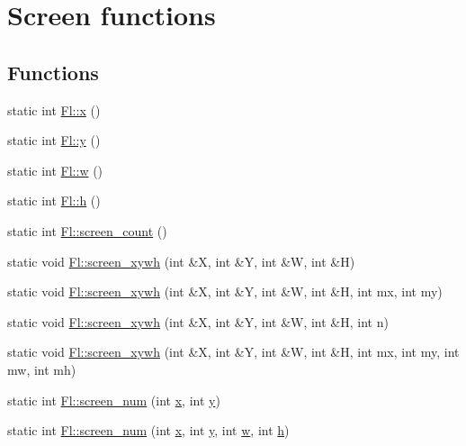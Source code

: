 \hypertarget{group__fl__screen}{}\section{Screen functions}
\label{group__fl__screen}
\subsection*{Functions}
\begin{DoxyCompactItemize}
\item 
static int \hyperlink{group__fl__screen_ga129f4b9d14ad1d720d60b7881693d6ec}{Fl\+::x} ()
\item 
static int \hyperlink{group__fl__screen_ga6c89bea45612ee83941e879b3396d3a5}{Fl\+::y} ()
\item 
static int \hyperlink{group__fl__screen_ga4fcd39428db4299026322c91715cf379}{Fl\+::w} ()
\item 
static int \hyperlink{group__fl__screen_ga0a9410a98136445bacce42b2e3ad4e84}{Fl\+::h} ()
\item 
static int \hyperlink{group__fl__screen_ga8eff7d1c39455cd135ff4560250b3d05}{Fl\+::screen\+\_\+count} ()
\item 
static void \hyperlink{group__fl__screen_ga510d26cb2d6ec0688cf1eb8c5d9e5a1e}{Fl\+::screen\+\_\+xywh} (int \&X, int \&Y, int \&W, int \&H)
\item 
static void \hyperlink{group__fl__screen_gae6ee037d784b5b565348073526852414}{Fl\+::screen\+\_\+xywh} (int \&X, int \&Y, int \&W, int \&H, int mx, int my)
\item 
static void \hyperlink{group__fl__screen_ga4a7c584cbfc0d2c386830ebc6a0bd097}{Fl\+::screen\+\_\+xywh} (int \&X, int \&Y, int \&W, int \&H, int n)
\item 
static void \hyperlink{group__fl__screen_ga67bb3367297f93cc3cda4d2a5c7a1e85}{Fl\+::screen\+\_\+xywh} (int \&X, int \&Y, int \&W, int \&H, int mx, int my, int mw, int mh)
\item 
static int \hyperlink{group__fl__screen_gac734e0f75cf2f809f677f20c22828f9b}{Fl\+::screen\+\_\+num} (int \hyperlink{group__fl__screen_ga129f4b9d14ad1d720d60b7881693d6ec}{x}, int \hyperlink{group__fl__screen_ga6c89bea45612ee83941e879b3396d3a5}{y})
\item 
static int \hyperlink{group__fl__screen_ga8eaecef645e1f25d5a53a87df23e6466}{Fl\+::screen\+\_\+num} (int \hyperlink{group__fl__screen_ga129f4b9d14ad1d720d60b7881693d6ec}{x}, int \hyperlink{group__fl__screen_ga6c89bea45612ee83941e879b3396d3a5}{y}, int \hyperlink{group__fl__screen_ga4fcd39428db4299026322c91715cf379}{w}, int \hyperlink{group__fl__screen_ga0a9410a98136445bacce42b2e3ad4e84}{h})

\end{DoxyCompactItemize}

